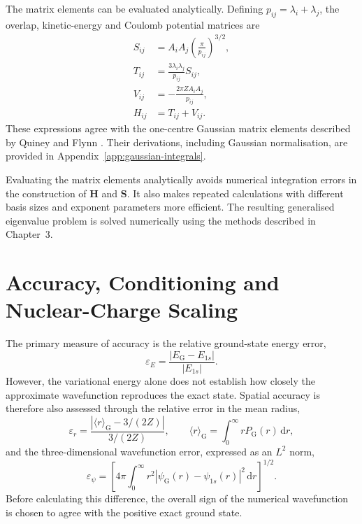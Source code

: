 The matrix elements can be evaluated
analytically. Defining
$p_{ij}=\lambda_i+\lambda_j$, the overlap,
kinetic-energy and Coulomb potential
matrices are
\begin{align}
    S_{ij}
    &=A_iA_j
      \left(\frac{\pi}{p_{ij}}\right)^{3/2},
    \label{eq:overlap_matrix}\\
    T_{ij}
    &=\frac{3\lambda_i\lambda_j}{p_{ij}}S_{ij},
    \label{eq:kinetic_matrix}\\
    V_{ij}
    &=-\frac{2\pi ZA_iA_j}{p_{ij}},
    \label{eq:potential_matrix}\\
    H_{ij}
    &=T_{ij}+V_{ij}.
    \label{eq:hamiltonian_matrix}
\end{align}
These expressions agree with the
one-centre Gaussian matrix elements
described by Quiney and Flynn
\cite{quiney_art_2018}. Their derivations,
including Gaussian normalisation, are
provided in Appendix~\ref{app:gaussian-integrals}.

Evaluating the matrix elements analytically
avoids numerical integration errors in
the construction of $\mathbf H$ and
$\mathbf S$. It also makes repeated
calculations with different basis sizes
and exponent parameters more efficient.
The resulting generalised eigenvalue
problem is solved numerically using the
methods described in Chapter~3.



\section{Accuracy, Conditioning and Nuclear-Charge Scaling}

The primary measure of accuracy is the
relative ground-state energy error,
\begin{equation}
    \varepsilon_E
    =\frac{|E_{\mathrm G}-E_{1s}|}{|E_{1s}|}.
    \label{eq:energy_error}
\end{equation}
However, the variational energy alone
does not establish how closely the
approximate wavefunction reproduces
the exact state. Spatial accuracy is
therefore also assessed through the
relative error in the mean radius,
\begin{equation}
    \varepsilon_r
    =\frac{|\langle r\rangle_{\mathrm G}-3/(2Z)|}
           {3/(2Z)},
    \qquad
    \langle r\rangle_{\mathrm G}
    =\int_0^\infty rP_{\mathrm G}(r)\,\mathrm dr,
    \label{eq:radius_error}
\end{equation}
and the three-dimensional wavefunction
error, expressed as an $L^2$ norm,
\begin{equation}
    \varepsilon_\psi
    =\left[
        4\pi\int_0^\infty r^2
        |\psi_{\mathrm G}(r)-\psi_{1s}(r)|^2
        \,\mathrm dr
      \right]^{1/2}.
    \label{eq:wavefunction_error}
\end{equation}
Before calculating this difference,
the overall sign of the numerical
wavefunction is chosen to agree
with the positive exact ground state.

